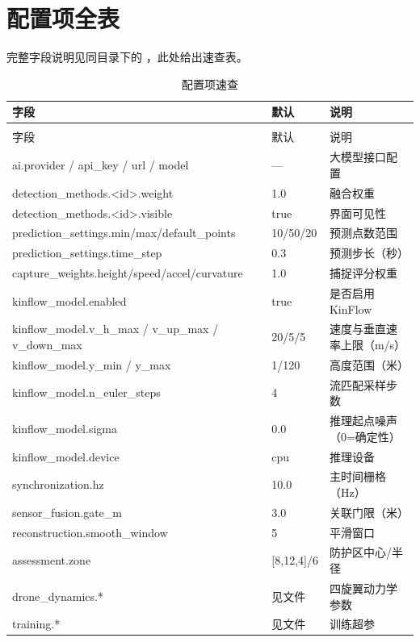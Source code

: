 \section{配置项全表}

完整字段说明见同目录下的 ，此处给出速查表。

\begin{longtable}{@{}>{\raggedright\ttfamily\scriptsize}p{6.6cm}>{\raggedright\scriptsize}p{3.3cm}>{\raggedright\arraybackslash}p{4.2cm}@{}}
\caption{配置项速查}\label{tab:confall}\\
\toprule
字段 & 默认 & 说明 \\
\midrule
\endfirsthead
\multicolumn{3}{@{}l}{\small 续表~\thetable}\\
\toprule
字段 & 默认 & 说明 \\
\midrule
\endhead
\bottomrule
\endlastfoot
ai.provider / api\_key / url / model & --- & 大模型接口配置 \\
detection\_methods.<id>.weight & 1.0 & 融合权重 \\
detection\_methods.<id>.visible & true & 界面可见性 \\
prediction\_settings.min/max/default\_points & 10/50/20 & 预测点数范围 \\
prediction\_settings.time\_step & 0.3 & 预测步长（秒） \\
capture\_weights.height/speed/accel/curvature & 1.0 & 捕捉评分权重 \\
kinflow\_model.enabled & true & 是否启用 KinFlow \\
kinflow\_model.v\_h\_max / v\_up\_max / v\_down\_max & 20/5/5 & 速度与垂直速率上限（m/s） \\
kinflow\_model.y\_min / y\_max & 1/120 & 高度范围（米） \\
kinflow\_model.n\_euler\_steps & 4 & 流匹配采样步数 \\
kinflow\_model.sigma & 0.0 & 推理起点噪声（0=确定性） \\
kinflow\_model.device & cpu & 推理设备 \\
synchronization.hz & 10.0 & 主时间栅格（Hz） \\
sensor\_fusion.gate\_m & 3.0 & 关联门限（米） \\
reconstruction.smooth\_window & 5 & 平滑窗口 \\
assessment.zone & [8,12,4]/6 & 防护区中心/半径 \\
drone\_dynamics.* & 见文件 & 四旋翼动力学参数 \\
training.* & 见文件 & 训练超参 \\

\end{longtable}
